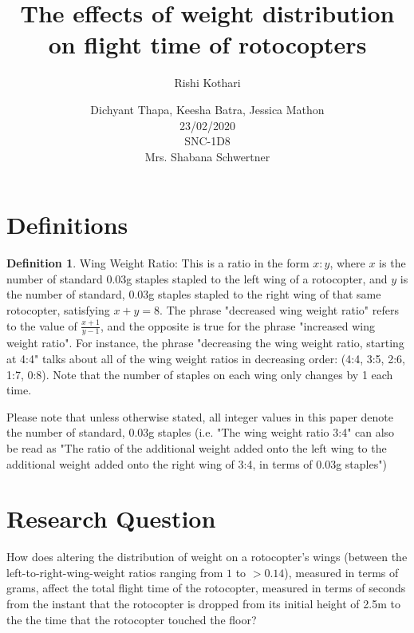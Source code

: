 \documentclass[]{article}
\title{\Huge The effects of weight distribution on flight time of rotocopters}
\author{\LARGE Rishi Kothari}
\date{Dichyant Thapa, Keesha Batra, Jessica Mathon \\ 23/02/2020 \\ SNC-1D8 \\ Mrs. Shabana Schwertner}
\theoremstyle{definition}
\newtheorem{definition}{Definition}[section]
\begin{document}
\maketitle

\newpage

\tableofcontents
\newpage


\section{Definitions}
\begin{definition}{Wing Weight Ratio:}
    This is a ratio in the form $x:y$, where $x$ is the number of standard 0.03g staples stapled to the left wing of a rotocopter, and $y$ is the number of standard, 0.03g staples stapled to the right wing of that same rotocopter, satisfying $x + y = 8$. The phrase "decreased wing weight ratio" refers to the value of $\frac{x+1}{y-1}$, and the opposite is true for the phrase "increased wing weight ratio". For instance, the phrase "decreasing the wing weight ratio, starting at 4:4" talks about all of the wing weight ratios in decreasing order: (4:4, 3:5, 2:6, 1:7, 0:8). Note that the number of staples on each wing only changes by 1 each time.
\end{definition}

Please note that unless otherwise stated, all integer values in this paper denote the number of standard, 0.03g staples (i.e. "The wing weight ratio 3:4" can also be read as "The ratio of the additional weight added onto the left wing to the additional weight added onto the right wing of 3:4, in terms of 0.03g staples")

\section{Research Question}
How does altering the distribution of weight on a rotocopter's wings (between the left-to-right-wing-weight ratios ranging from $1$ to $>0.14$), measured in terms of grams, affect the total flight time of the rotocopter, measured in terms of seconds from the instant that the rotocopter is dropped from its initial height of 2.5m to the the time that the rotocopter touched the floor?
\end{document}
